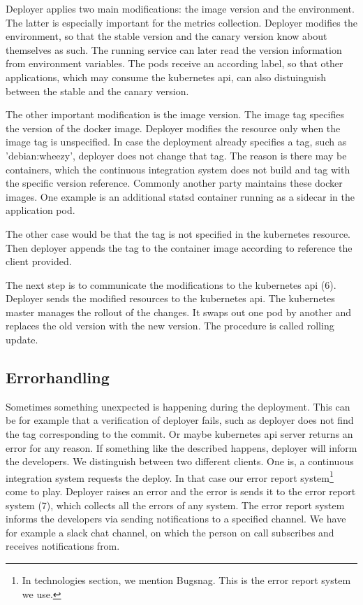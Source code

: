 Deployer applies two main modifications: the image version and the environment. The latter
is especially important for the metrics collection. Deployer modifies the environment, so
that the stable version and the canary version know about themselves as such. The running
service can later read the version information from environment variables. The pods
receive an according label, so that other applications, which may consume the kubernetes
api, can also distuinguish between the stable and the canary version.

The other important modification is the image version. The image tag specifies the version
of the docker image. Deployer modifies the resource only when the image tag is
unspecified. In case the deployment already specifies a tag, such as 'debian:wheezy',
deployer does not change that tag. The reason is there may be containers, which the
continuous integration system does not build and tag with the specific version
reference. Commonly another party maintains these docker images. One example is an
additional statsd container running as a sidecar in the application pod.

The other case would be that the tag is not specified in the kubernetes resource. Then
deployer appends the tag to the container image according to reference the client provided.

The next step is to communicate the modifications to the kubernetes api (6). Deployer
sends the modified resources to the kubernetes api. The kubernetes master manages the
rollout of the changes. It swaps out one pod by another and replaces the old version with
the new version. The procedure is called rolling update.

\subsection{Errorhandling}

Sometimes something unexpected is happening during the deployment. This can be for example
that a verification of deployer fails, such as deployer does not find the tag
corresponding to the commit. Or maybe kubernetes api server returns an error for any
reason. If something like the described happens, deployer will inform the developers. We
distinguish between two different clients. One is, a continuous integration system
requests the deploy. In that case our error report system\footnote{In technologies
  section, we mention Bugsnag. This is the error report system we use.} come to
play. Deployer raises an error and the error is sends it to the error report system (7),
which collects all the errors of any system. The error report system informs the
developers via sending notifications to a specified channel. We have for example a slack
chat channel, on which the person on call subscribes and receives notifications from.

